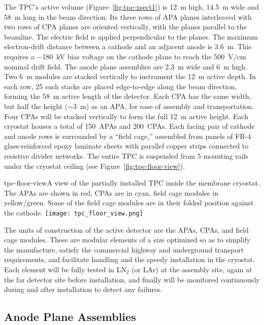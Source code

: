 The TPC's active volume (Figure~\ref{fig:tpc-xsect1}) is 12~m high, 14.5~m wide and 58~m long in the beam direction. 
Its three rows of APA planes interleaved with two rows of CPA planes 
are oriented vertically, with the planes parallel to the beamline. The  
electric field is applied perpendicular to the planes.
The maximum electron-drift distance between a cathode and an adjacent 
anode is 3.6~m. This requires a $-$180~kV bias voltage on the cathode plane to reach the 500~V/cm nominal drift field. The anode plane assemblies are 
2.3~m wide and 6~m high. Two 6~m modules are stacked vertically to 
instrument the 12~m active depth. In each row, 25 such stacks are placed edge-to-edge 
along the beam direction, forming the 58~m active length of the detector.  Each CPA has the same width, but half the height ($\sim$3~m) as an APA, for ease of assembly and transportation.  Four CPAs will be stacked vertically to form the full 12~m active height. 
Each cryostat houses a total of 150~APAs and 200~CPAs.
Each facing pair of cathode and anode rows is surrounded by a 
``field cage,'' assembled from panels of FR-4 glass-reinforced epoxy laminate sheets with parallel copper strips connected to resistive divider networks. 
The entire TPC is suspended from 5 mounting rails under the cryostat ceiling (see Figure~\ref{fig:tpc-floor-view}).


\begin{cdrfigure}{tpc-floor-view}{A view of the partially installed TPC inside the membrane cryostat.  The APAs are shown in red, CPAs are in cyan, field cage modules in yellow/green. Some of the field cage modules are in their folded position against the cathode.}
\texttt{[image: tpc\_floor\_view.png]}
\end{cdrfigure}

The units of construction of the active detector are the APAs, CPAs, and field cage modules. These are modular elements of a size optimized
so as to simplify the manufacture, satisfy the commercial highway and underground transport requirements,
and facilitate handling and the speedy installation in the cryostat.  Each element will be fully tested in LN$_2$ (or LAr) at the assembly site,
again at the far detector site before installation, and finally will be monitored continuously during and
after installation to detect any failures.


\subsection{Anode Plane Assemblies}
\label{subsec:fd-ref-apa}

